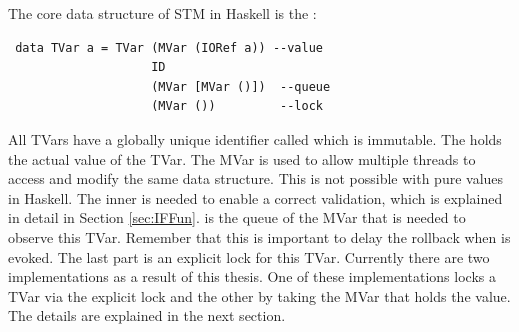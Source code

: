 The core data structure of STM in Haskell is the :
\begin{lstlisting}
 data TVar a = TVar (MVar (IORef a)) --value
                    ID
                    (MVar [MVar ()])  --queue
                    (MVar ())         --lock
\end{lstlisting}
All TVars have a globally unique identifier called  which is immutable. The  
holds the actual value of the TVar. The MVar is used to allow multiple threads to access and modify the same 
data structure. This is not possible with pure values in Haskell. The inner  is needed to enable a 
correct validation, which is explained in detail
in Section \ref{sec:IFFun}.  is the queue of the MVar that is needed to observe this TVar. 
Remember that this is important to delay the rollback when 
is evoked. The last part is an explicit lock for this TVar. Currently there are two implementations as 
a result of this thesis. One of these implementations locks a TVar via 
the explicit lock and the other by taking the MVar that holds the value. The details are explained in the next section. 

